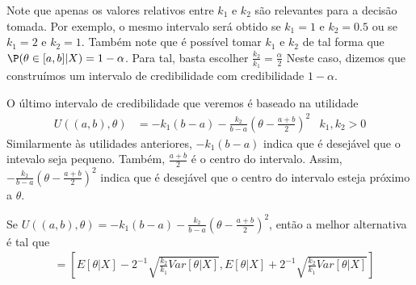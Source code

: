 Note que apenas os valores relativos entre
$k_1$ e $k_2$ são relevantes para a decisão tomada.
Por exemplo, o mesmo intervalo será obtido se 
$k_1=1$ e $k_2=0.5$ ou se $k_1=2$ e $k_2=1$.
Também note que é possível tomar $k_1$ e $k_2$ 
de tal forma que $\P(\theta \in [a,b]|X) = 1-\alpha$.
Para tal, basta escolher 
$\frac{k_2}{k_1} = \frac{\alpha}{2}$ 
Neste caso, dizemos que construímos um intervalo de credibilidade com credibilidade $1-\alpha$.

O último intervalo de credibilidade que 
veremos é baseado na utilidade
\begin{align*}
 U((a,b),\theta)
 &= -k_{1}(b-a)
 -\frac{k_{2}}{b-a}\left(\theta -\frac{a+b}{2}\right)^{2}
 & k_{1},k_{2} > 0
\end{align*}
Similarmente às utilidades anteriores,
$-k_{1}(b-a)$ indica que 
é desejável que o intevalo seja pequeno.
Também, $\frac{a+b}{2}$ é o centro do intervalo.
Assim, $-\frac{k_{2}}{b-a}\left(\theta - \frac{a+b}{2}\right)^{2}$ indica que 
é desejável que o centro do intervalo esteja
próximo a $\theta$.
\begin{theorem}
 \label{thm:credible_interval_3}
 Se $U((a,b),\theta) = -k_{1}(b-a) -\frac{k_{2}}{b-a}\left(\theta - \frac{a+b}{2}\right)^{2}$,
 então a melhor alternativa é tal que
 \begin{align*}
  [a,b]	&= \left[E[\theta|X]-2^{-1}\sqrt{\frac{k_2}{k_1}Var[\theta|X]}, E[\theta|X]+2^{-1}\sqrt{\frac{k_2}{k_1}Var[\theta|X]}\right]
 \end{align*}
\end{theorem}
